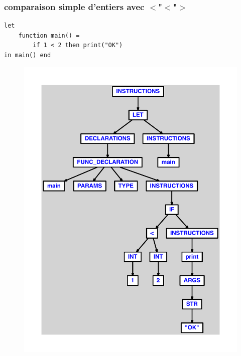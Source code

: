 \documentclass{article}
\begin{document}
\subsubsection{comparaison simple d'entiers avec $ < $"$ < $"$ > $}
\begin{lstlisting}
let
	function main() =
		if 1 < 2 then print("OK")
in main() end
\end{lstlisting}
\newpage
\begin{figure}[H]
\centering
\includegraphics[max width=\textwidth]{ast/ast_167.pdf}
\end{figure}
\newpage
\end{document}
